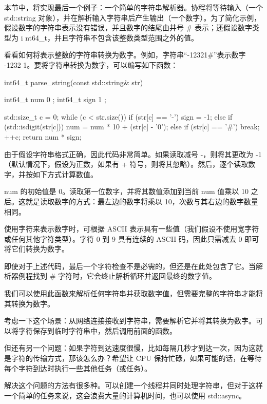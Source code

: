 
本节中，将实现最后一个例子：一个简单的字符串解析器。协程将等待输入（一个 std::string 对象），并在解析输入字符串后产生输出（一个数字）。为了简化示例，假设数字的字符串表示没有错误，并且数字的结尾由井号 \# 表示；还假设数字类型为 i nt64\_t，并且字符串不包含该整数类型范围之外的值。


看看如何将表示整数的字符串转换为数字。例如，字符串“-12321\#”表示数字 -1232 1。要将字符串转换为数字，可以编写如下函数：

\begin{cpp}
int64_t parse_string(const std::string& str) {
    int64_t num{ 0 };
    int64_t sign { 1 };

    std::size_t c = 0;
    while (c < str.size()) {
        if (str[c] == '-') {
            sign = -1;
        }
        else if (std::isdigit(str[c])) {
            num = num * 10 + (str[c] - '0');
        }
        else if (str[c] == '#') {
            break;
        }
        ++c;
    }
    return num * sign;
}
\end{cpp}

由于假设字符串格式正确，因此代码非常简单。如果读取减号 -，则将其更改为 -1（默认情况下，假设为正数，如果有 + 符号，则将其忽略）。然后，逐个读取数字，并按如下方式计算数值。

num 的初始值是 0。读取第一位数字，并将其数值添加到当前 num 值乘以 10 之后。这就是读取数字的方式：最左边的数字将乘以 10，次数与其右边的数字数量相同。

使用字符来表示数字时，可根据 ASCII 表示具有一些值（我们假设不使用宽字符或任何其他字符类型）。字符 0 到 9 具有连续的 ASCII 码，因此只需减去 0 即可将它们转换为数字。

即使对于上述代码，最后一个字符检查不是必需的，但还是在此处包含了它。当解析器例程找到 \# 字符时，它会终止解析循环并返回最终的数字值。

我们可以使用此函数来解析任何字符串并获取数字值，但需要完整的字符串才能将其转换为数字。

考虑一下这个场景：从网络连接接收到字符串，需要解析它并将其转换为数字。可以将字符保存到临时字符串中，然后调用前面的函数。

但还有另一个问题：如果字符到达速度很慢，比如每隔几秒才到达一次，因为这就是字符的传输方式，那该怎么办？希望让 CPU 保持忙碌，如果可能的话，在等待每个字符到达时执行一些其他任务（或任务）。

解决这个问题的方法有很多种。可以创建一个线程并同时处理字符串，但对于这样一个简单的任务来说，这会浪费大量的计算机时间，也可以使用 std::async。

